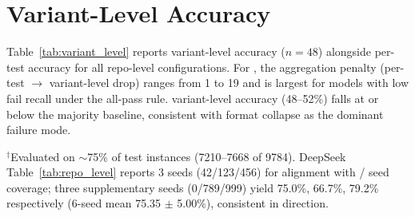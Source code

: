 \section{Variant-Level Accuracy}
\label{app:variant_level}

Table~\ref{tab:variant_level} reports variant-level accuracy ($n{=}48$) alongside per-test accuracy for all repo-level configurations. For \cls{}, the aggregation penalty (per-test $\to$ variant-level drop) ranges from 1\pp{} to 19\pp{} and is largest for models with low fail recall under the all-pass rule. \cwm{} variant-level accuracy (48--52\%) falls at or below the majority baseline, consistent with format collapse as the dominant failure mode.

\begin{table}[h]
\centering
\small
\caption{Repo-level per-test vs.\ variant-level accuracy ($n{=}48$ variants). Penalty = per-test $-$ variant-level. \traj{} predicts variant outcomes directly (no aggregation). Variant-level majority baseline: 54.17\% (26/48).}
\label{tab:variant_level}
\setlength{\tabcolsep}{3pt}
\vspace{2pt}

{\footnotesize $^\dagger$Evaluated on ${\sim}$75\% of test instances (7210--7668 of 9784). DeepSeek \traj{} Table~\ref{tab:repo_level} reports 3 seeds (42/123/456) for alignment with \cls{}/\cwm{} seed coverage; three supplementary seeds (0/789/999) yield 75.0\%, 66.7\%, 79.2\% respectively (6-seed mean 75.35 $\pm$ 5.00\%), consistent in direction.}
\end{table}

